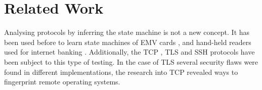 \chapter{Related Work}\label{relatedwork}
\iffalse
In this chapter you demonstrate that you are sufficiently aware of the
state-of-art knowledge of the problem domain that you have investigated as
well as demonstrating that you have found a \emph{new} solution / approach / method.

TODO: Add paper by Joeri
\fi

Analysing protocols by inferring the state machine is not a new concept. It has been used before to learn state machines of EMV cards \cite{bankcards}, and hand-held readers used for internet banking \cite{identifier}. Additionally, the TCP \cite{tcpchecking}, TLS \cite{tlsfuzzing} and SSH \cite{sshchecking} protocols have been subject to this type of testing. In the case of TLS several security flaws were found in different implementations, the research into TCP revealed ways to fingerprint remote operating systems.